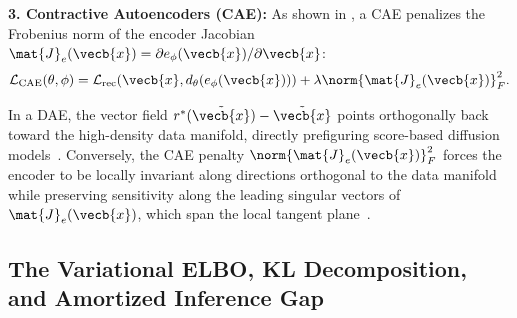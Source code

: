 \documentclass[../../../../master.tex]{subfiles}
\begin{document}
\begin{coremath}
\textbf{3. Contractive Autoencoders (CAE):} As shown in , a CAE penalizes the Frobenius norm of the encoder Jacobian $\mat{J}_{e}(\vecb{x}) = \partial e_\phi(\vecb{x}) / \partial \vecb{x}$:
\begin{equation}\label{eq:vae:cae_loss}
  \mathcal{L}_{\mathrm{CAE}}(\theta, \phi) = \mathcal{L}_{\mathrm{rec}}(\vecb{x}, d_\theta(e_\phi(\vecb{x}))) + \lambda \norm{\mat{J}_e(\vecb{x})}_F^2.
\end{equation}
\end{coremath}

\begin{intuition}
In a DAE, the vector field $r^*(\tilde{\vecb{x}}) - \tilde{\vecb{x}}$ points orthogonally back toward the high-density data manifold, directly prefiguring score-based diffusion models~. Conversely, the CAE penalty $\norm{\mat{J}_e(\vecb{x})}_F^2$ forces the encoder to be locally invariant along directions orthogonal to the data manifold while preserving sensitivity along the leading singular vectors of $\mat{J}_e(\vecb{x})$, which span the local tangent plane~.
\end{intuition}

\subsection{The Variational ELBO, KL Decomposition, and Amortized Inference Gap}
\end{document}
